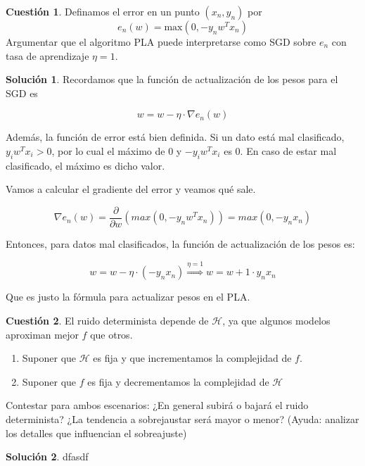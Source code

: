 \documentclass[a4paper, 11pt]{article}
\theoremstyle{definition}
\newtheorem{cuestion}{Cuestión}
\newtheorem*{solucion}{Solución}
\begin{document}
  \begin{cuestion}
    Definamos el error en un punto $(x_n,y_n)$ por
      \[
      e_n(w)=\text{max}(0,-y_nw^Tx_n)
      \]
      Argumentar que el algoritmo PLA puede interpretarse como SGD sobre $e_n$ con tasa de aprendizaje $\eta=1$.
  \end{cuestion}

  \begin{solucion}
    Recordamos que la función de actualización de los pesos para el SGD es

    $$ w = w - \eta \cdot \nabla e_n(w) $$

    Además, la función de error está bien definida. Si un dato está mal clasificado, $y_iw^Tx_i > 0$, por lo cual el máximo de 0 y $-y_iw^Tx_i$ es 0. En caso de estar mal clasificado, el máximo es dicho valor.

    Vamos a calcular el gradiente del error y veamos qué sale.

    $$ \nabla e_n(w) = \frac{\partial}{\partial w} \left( max(0, -y_nw^Tx_n) \right) = max(0, -y_nx_n) $$

    Entonces, para datos mal clasificados, la función de actualización de los pesos es:

    $$ w = w - \eta \cdot (-y_nx_n) \overset{\eta=1}{\Rightarrow} w = w + 1 \cdot y_nx_n $$

    Que es justo la fórmula para actualizar pesos en el PLA.
  \end{solucion}

  \begin{cuestion}
    El ruido determinista depende de $\mathcal{H}$, ya que algunos modelos aproximan mejor $f$ que otros.
    \begin{enumerate}
        \item Suponer que $\mathcal{H}$ es fija y que incrementamos la complejidad de $f$.
        \item Suponer que $ f$ es fija y decrementamos la complejidad de $\mathcal{H}$
    \end{enumerate}
    Contestar para ambos escenarios: ¿En general subirá o bajará el ruido determinista? ¿La tendencia a sobrejaustar será mayor o menor? (Ayuda: analizar los detalles que influencian el sobreajuste)
  \end{cuestion}

  \begin{solucion}
    dfasdf
  \end{solucion}
\end{document}
